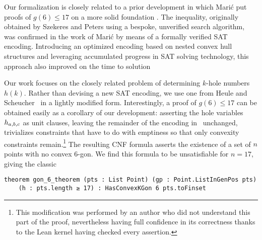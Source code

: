 Our formalization is closely related to a prior development
in which Marić put proofs of $g(6) \leq 17$ on a more solid foundation \cite{19maric_fast_formal_proof_erdos_szekeres_conjecture_convex_polygons_most_six_points}.
The inequality,
originally obtained by Szekeres and Peters \cite{06szekeres_computer_solution_17_point_erdos_szekeres_problem}
using a bespoke, unverified search algorithm,
was confirmed in the work of Marić
by means of a formally verified SAT encoding.
Introducing an optimized encoding based on nested convex hull structures
and leveraging accumulated progress in SAT solving technology, %
this approach also improved on the time to solution

Our work focuses on the closely related problem
of determining $k$-hole numbers $h(k)$.
Rather than devising a new SAT encoding,
we use one from Heule and Scheucher~\cite{emptyHexagonNumber}
in a lightly modified form.
Interestingly,
a proof of $g(6) \leq 17$ can be obtained easily
as a corollary of our development:
asserting the hole variables $\hvar_{a,b,c}$ as unit clauses,
leaving the remainder of the encoding in~ unchanged,
trivializes constraints that have to do with emptiness
so that only convexity constraints remain.\footnote{
This modification was performed by an author
who did not understand this part of the proof,
nevertheless having full confidence in its correctness
thanks to the Lean kernel having checked every assertion.}
The resulting CNF formula
asserts the existence of a set of $n$ points
with no convex $6$-gon.
We find this formula to be unsatisfiable for $n = 17$,
giving the classic
\begin{lstlisting}
theorem gon_6_theorem (pts : List Point) (gp : Point.ListInGenPos pts)
    (h : pts.length ≥ 17) : HasConvexKGon 6 pts.toFinset
\end{lstlisting}

